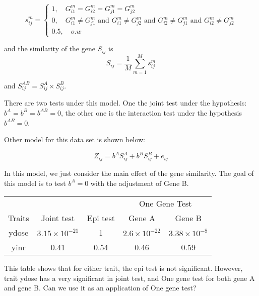 \documentclass{article}
\begin{document}
        \begin{equation*}
            s_{ij}^m=\begin{cases}
                1,\quad G_{i1}^m=G_{i2}^m=G_{j1}^m=G_{j2}^m \\
                0,\quad G_{i1}^m\neq G_{j1}^m \mbox{ and } G_{i1}^m\neq G_{j2}^m \mbox{ and } G_{i2}^m\neq G_{j1}^m \mbox{ and } G_{i2}^m\neq G_{j2}^m \\
                0.5,\quad o.w
         \end{cases}
        \end{equation*}

        and the similarity of the gene $S_{ij}$ is
        \[
            S_{ij}=\frac{1}{M}\sum^M_{m=1}s^m_{ij}
        \]

        and $S^{AB}_{ij}=S^A_{ij}\times S^B_{ij}$.

        There are two tests under this model. One the joint test under the hypothesis: $b^A=b^B=b^{AB}=0$, the other one is the interaction test under the hypothesis $b^{AB}=0$.

        Other model for this data set is shown below:

        \begin{equation*}
            Z_{ij}=b^AS_{ij}^A+b^BS_{ij}^B+e_{ij}
        \end{equation*}

        In this model, we just consider the main effect of the gene similarity. The goal of this model is to test $b^A=0$ with the adjustment of Gene B.

        \begin{table}[htbp]
            \centering
            \begin{tabular}{c|cccc}
                \toprule
                 & & & \multicolumn{2}{c}{One Gene Test}\\
                 \cmidrule{4-5}
                 Traits & Joint test & Epi test & Gene A & Gene B\\
                 \hline
                 ydose & $3.15\times10^{-21}$   &   1   &   $2.6\times 10^{-22}$    &   $3.38\times10^{-8}$\\
                 yinr  & 0.41                  &   0.54&   0.46                    &   0.59            \\
                \bottomrule
            \end{tabular}
        \end{table}
        This table shows that for either trait, the epi test is not significant. However, trait ydose has a very significant in joint test, and One gene test for both gene A and gene B. Can we use it as an application of One gene test?
        
\end{document}

